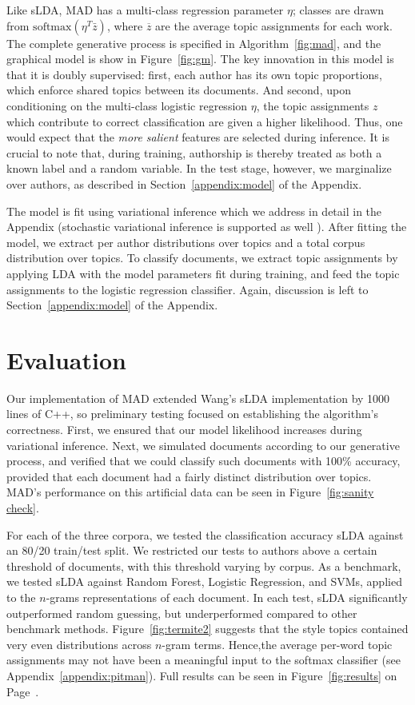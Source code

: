 \documentclass[14pt]{article} %
\theoremstyle{plain}
\theoremstyle{definition}
\theoremstyle{remark}
\begin{document}
Like sLDA, MAD has a multi-class regression parameter $\eta$; classes are drawn from $\text{softmax}(\eta^T\bar{z})$, where $\overline{z}$ are the average topic assignments for each work. The complete generative process is specified in Algorithm~\ref{fig:mad}, and the graphical model is show in Figure~\ref{fig:gm}. The key innovation in this model is that it is doubly supervised: first, each author has its own topic proportions, which enforce shared topics between its documents. And second, upon conditioning on the multi-class logistic regression $\eta$, the topic assignments $z$ which contribute to correct classification are given a higher likelihood.  Thus, one would expect that the \emph{more salient} features are selected during inference. It is crucial to note that, during training, authorship is thereby treated as both a known label and a random variable. In the test stage, however, we marginalize over authors, as described in Section~\ref{appendix:model} of the Appendix.

The model is fit using variational inference \cite{wainwright2008graphical} which we address in detail in the Appendix (stochastic variational inference is supported as well \cite{hoffman2013stochastic}). After fitting the model, we extract per author distributions over topics and a total corpus distribution over topics. To classify documents, we extract topic assignments by applying LDA with the model parameters fit during training, and feed the topic assignments to the logistic regression classifier. Again, discussion is left to Section~\ref{appendix:model} of the Appendix. 

\section{Evaluation}

Our implementation of MAD extended Wang's sLDA implementation by 1000 lines of C++, so preliminary testing focused on establishing the algorithm's correctness. First, we ensured that our model likelihood increases during variational inference. Next, we simulated documents according to our generative process, and verified that we could classify such documents with 100\% accuracy, provided that each document had a fairly distinct distribution over topics. MAD's performance on this artificial data can be seen in Figure~\ref{fig:sanity check}. 

For each of the three corpora, we tested the classification accuracy sLDA against an 80/20 train/test split. We restricted our tests to authors above a certain threshold of documents, with this threshold varying by corpus. As a benchmark, we tested sLDA against Random Forest, Logistic Regression, and SVMs, applied to the $n$-grams representations of each document. In each test, sLDA significantly outperformed random guessing, but underperformed compared to other benchmark methods. Figure~\ref{fig:termite2} suggests that the style topics contained very even distributions across $n$-gram terms. Hence,the average per-word topic assignments may not have been a meaningful input to the softmax classifier (see Appendix~\ref{appendix:pitman}). Full results can be seen in Figure~\ref{fig:results} on Page~\pageref{fig:results}.
\end{document}
